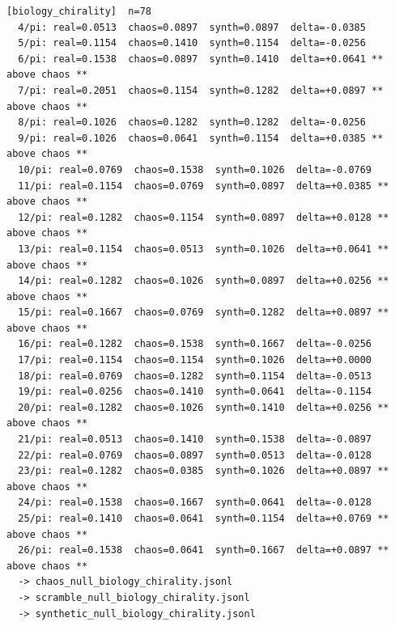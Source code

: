 \documentclass[11pt, letterpaper, openany]{book}
\begin{document}
\begin{empiricalbox}
\begin{lstlisting}[style=terminal]
[biology_chirality]  n=78
  4/pi: real=0.0513  chaos=0.0897  synth=0.0897  delta=-0.0385
  5/pi: real=0.1154  chaos=0.1410  synth=0.1154  delta=-0.0256
  6/pi: real=0.1538  chaos=0.0897  synth=0.1410  delta=+0.0641 ** above chaos **
  7/pi: real=0.2051  chaos=0.1154  synth=0.1282  delta=+0.0897 ** above chaos **
  8/pi: real=0.1026  chaos=0.1282  synth=0.1282  delta=-0.0256
  9/pi: real=0.1026  chaos=0.0641  synth=0.1154  delta=+0.0385 ** above chaos **
  10/pi: real=0.0769  chaos=0.1538  synth=0.1026  delta=-0.0769
  11/pi: real=0.1154  chaos=0.0769  synth=0.0897  delta=+0.0385 ** above chaos **
  12/pi: real=0.1282  chaos=0.1154  synth=0.0897  delta=+0.0128 ** above chaos **
  13/pi: real=0.1154  chaos=0.0513  synth=0.1026  delta=+0.0641 ** above chaos **
  14/pi: real=0.1282  chaos=0.1026  synth=0.0897  delta=+0.0256 ** above chaos **
  15/pi: real=0.1667  chaos=0.0769  synth=0.1282  delta=+0.0897 ** above chaos **
  16/pi: real=0.1282  chaos=0.1538  synth=0.1667  delta=-0.0256
  17/pi: real=0.1154  chaos=0.1154  synth=0.1026  delta=+0.0000
  18/pi: real=0.0769  chaos=0.1282  synth=0.1154  delta=-0.0513
  19/pi: real=0.0256  chaos=0.1410  synth=0.0641  delta=-0.1154
  20/pi: real=0.1282  chaos=0.1026  synth=0.1410  delta=+0.0256 ** above chaos **
  21/pi: real=0.0513  chaos=0.1410  synth=0.1538  delta=-0.0897
  22/pi: real=0.0769  chaos=0.0897  synth=0.0513  delta=-0.0128
  23/pi: real=0.1282  chaos=0.0385  synth=0.1026  delta=+0.0897 ** above chaos **
  24/pi: real=0.1538  chaos=0.1667  synth=0.0641  delta=-0.0128
  25/pi: real=0.1410  chaos=0.0641  synth=0.1154  delta=+0.0769 ** above chaos **
  26/pi: real=0.1538  chaos=0.0641  synth=0.1667  delta=+0.0897 ** above chaos **
  -> chaos_null_biology_chirality.jsonl
  -> scramble_null_biology_chirality.jsonl
  -> synthetic_null_biology_chirality.jsonl


\end{lstlisting}
\end{empiricalbox}
\end{document}
